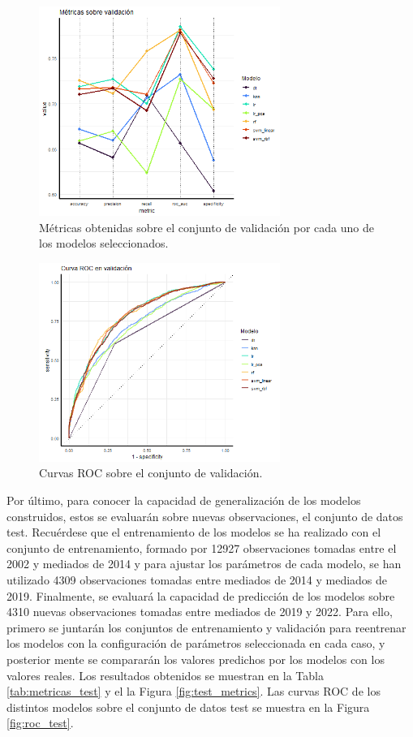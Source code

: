 \documentclass[12pt,a4paper,]{book}
\numberwithin{dummy}{section}
\theoremstyle{ocrenumbox}
\theoremstyle{blacknumex}
\theoremstyle{blacknumbox}
\theoremstyle{ocrenum}
\theoremstyle{ocrenum}
\begin{document}
\begin{figure}[h]
\centering
\includegraphics[width =0.7\textwidth]{graficos/validation_metrics.png}
\caption{Métricas obtenidas sobre el conjunto de validación por cada uno de los modelos seleccionados.}
\label{fig:validation_metrics}
\end{figure}

\begin{figure}[h]
\centering
\includegraphics[width =0.7\textwidth]{graficos/roc_validation.png}
\caption{Curvas ROC sobre el conjunto de validación.}
\label{fig:roc_validation}
\end{figure}

Por último, para conocer la capacidad de generalización de los modelos
construidos, estos se evaluarán sobre nuevas observaciones, el conjunto
de datos test. Recuérdese que el entrenamiento de los modelos se ha
realizado con el conjunto de entrenamiento, formado por 12927
observaciones tomadas entre el 2002 y mediados de 2014 y para ajustar
los parámetros de cada modelo, se han utilizado 4309 observaciones
tomadas entre mediados de 2014 y mediados de 2019. Finalmente, se
evaluará la capacidad de predicción de los modelos sobre 4310 nuevas
observaciones tomadas entre mediados de 2019 y 2022. Para ello, primero
se juntarán los conjuntos de entrenamiento y validación para reentrenar
los modelos con la configuración de parámetros seleccionada en cada
caso, y posterior mente se compararán los valores predichos por los
modelos con los valores reales. Los resultados obtenidos se muestran en
la Tabla \ref{tab:metricas_test} y el la Figura \ref{fig:test_metrics}.
Las curvas ROC de los distintos modelos sobre el conjunto de datos test
se muestra en la Figura \ref{fig:roc_test}.
\end{document}
